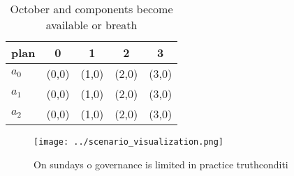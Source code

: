 \documentclass[a4paper]{article}
\begin{document}
\begin{table}
\begin{adjustbox}{width=0.6\columnwidth}
\begin{tabular}{|l|l|l|l|l|}
\hline
\textbf{plan} & \multicolumn{1}{c|}{\textbf{0}} & \multicolumn{1}{c|}{\textbf{1}} & \multicolumn{1}{c|}{\textbf{2}} & \multicolumn{1}{c|}{\textbf{3}} \\ \hline
\textbf{$a_0$}  & (0,0) & (1,0) & (2,0) & (3,0) \\ \hline
\textbf{$a_1$}  & (0,0) & (1,0) & (2,0) & (3,0) \\ \hline
\textbf{$a_2$}  & (0,0) & (1,0) & (2,0) & (3,0) \\ \hline
\end{tabular}
\end{adjustbox}
\caption{October and components become available or breath
}
\end{table}

\begin{figure}
\centering
\texttt{[image: ../scenario\_visualization.png]}
\caption{On sundays o governance is limited in practice truthconditi
}
\end{figure}
 
\end{document}
